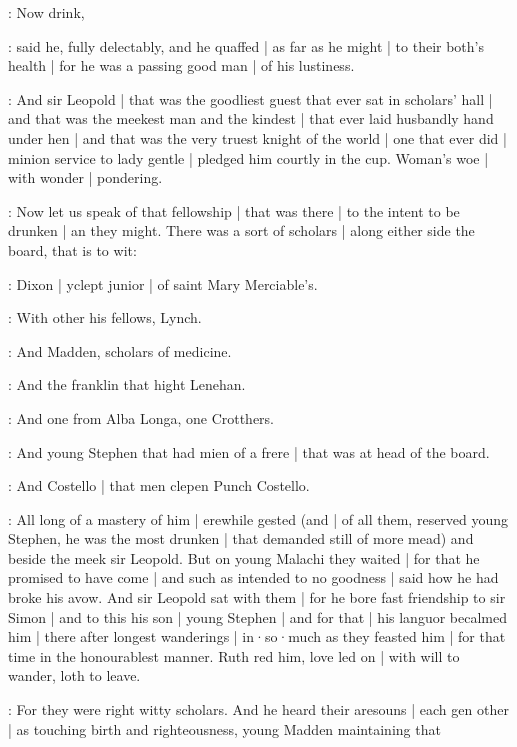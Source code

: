 \lenehan:
Now drink,

:
said he,
fully delectably,
and he quaffed |
as far as he might |
to their both's health |
for he was a passing good man |
of his lustiness.

:
And sir Leopold |
that was the goodliest guest that ever sat in scholars' hall |
and that was the meekest man and the kindest |
that ever laid husbandly hand under hen |
and that was the very truest knight of the world |
one that ever did |
minion service to lady gentle |
pledged him courtly in the cup.
Woman's woe |
with wonder |
pondering.


:
Now let us speak of that fellowship |
that was there |
to the intent to be drunken |
an they might.
There was a sort of scholars |
along either side the board,
that is to wit:

:
Dixon |
yclept junior |
of saint Mary Merciable's.

:
With other his fellows,
Lynch.

:
And Madden,
scholars of medicine.

:
And the franklin that hight Lenehan.

:
And one from Alba Longa,
one Crotthers.

:
And young Stephen
that had mien of a frere |
that was at head of the board.

:
And Costello |
that men clepen Punch Costello.

:
All long of a mastery of him |
erewhile gested
(and |
of all them,
reserved young Stephen,
he was the most drunken |
that demanded still of more mead)
and beside the meek sir Leopold.
But on young Malachi they waited |
for that he promised to have come |
and such as intended to no goodness |
said how he had broke his avow.
And sir Leopold sat with them |
for he bore fast friendship to sir Simon |
and to this his son |
young Stephen |
and for that |
his languor becalmed him |
there after longest wanderings |
in·so·much as they feasted him |
for that time in the honourablest manner.
Ruth red him,
love led on |
with will to wander,
loth to leave.


:
For they were right witty scholars.
And he heard their aresouns |
each gen other |
as touching birth and righteousness,
young Madden maintaining that

